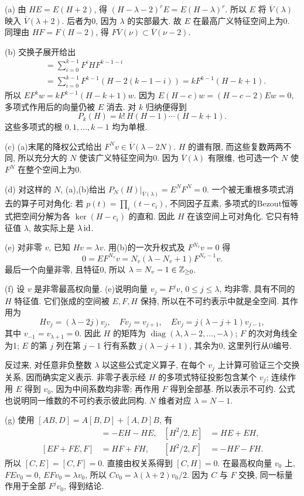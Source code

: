 \begin{solution}
(a) 由 $HE=E(H+2)$, 得 $(H-\lambda-2)^rE=E(H-\lambda)^r$. 所以 $E$ 将 $\overline V(\lambda)$ 映入 $\overline V(\lambda+2)$. 后者为0, 因为 $\lambda$ 的实部最大. 故 $E$ 在最高广义特征空间上为0. 同理由 $HF=F(H-2)$, 得 $F\overline V(\nu)\subset\overline V(\nu-2)$.

(b) 交换子展开给出
\begin{align*}
[E,F^k]&=\sum_{i=0}^{k-1}F^iHF^{k-1-i}\\
&=\sum_{i=0}^{k-1}F^{k-1}(H-2(k-1-i))
=kF^{k-1}(H-k+1).
\end{align*}
所以 $EF^kw=kF^{k-1}(H-k+1)w$. 因为 $E(H-c)w=(H-c-2)Ew=0$, 多项式作用后的向量仍被 $E$ 消去. 对 $k$ 归纳便得到
\[
P_k(H)=k!\,H(H-1)\cdots(H-k+1).
\]
这些多项式的根 $0,1,\ldots,k-1$ 均为单根.

(c) (a)末尾的降权公式给出 $F^Nv\in\overline V(\lambda-2N)$. $H$ 的谱有限, 而这些复数两两不同, 所以充分大的 $N$ 使该广义特征空间为0. 因为 $\overline V(\lambda)$ 有限维, 也可选一个 $N$ 使 $F^N$ 在整个空间上为0.

(d) 对这样的 $N$, (a),(b)给出 $P_N(H)|_{\overline V(\lambda)}=E^NF^N=0$. 一个被无重根多项式消去的算子可对角化: 若 $p(t)=\prod_i(t-c_i)$, 不同因子互素, 多项式的Bezout恒等式把空间分解为各 $\ker(H-c_i)$ 的直和. 因此 $H$ 在该空间上可对角化. 它只有特征值 $\lambda$, 故实际上是 $\lambda\operatorname{id}$.

(e) 对非零 $v$, 已知 $Hv=\lambda v$. 用(b)的一次升权式及 $F^{N_v}v=0$ 得
\[
0=EF^{N_v}v=N_v(\lambda-N_v+1)F^{N_v-1}v.
\]
最后一个向量非零, 且特征0, 所以 $\lambda=N_v-1\in\mathbb Z_{\ge0}$.

(f) 设 $v$ 是非零最高权向量. (e)说明向量 $v_j=F^jv$, $0\le j\le\lambda$, 均非零, 具有不同的 $H$ 特征值. 它们张成的空间被 $E,F,H$ 保持, 所以在不可约表示中就是全空间. 其作用为
\[
Hv_j=(\lambda-2j)v_j,\quad
Fv_j=v_{j+1},\quad
Ev_j=j(\lambda-j+1)v_{j-1},
\]
其中 $v_{-1}=v_{\lambda+1}=0$. 因此 $H$ 的矩阵为 $\operatorname{diag}(\lambda,\lambda-2,\ldots,-\lambda)$; $F$ 的次对角线全为1; $E$ 的第 $j$ 列在第 $j-1$ 行有系数 $j(\lambda-j+1)$, 其余为0, 这里列行从0编号.

反过来, 对任意非负整数 $\lambda$ 以这些公式定义算子, 在每个 $v_j$ 上计算可验证三个交换关系, 因而确实定义表示. 非零子表示经 $H$ 的多项式特征投影包含某个 $v_j$; 连续作用 $E$ 得到 $v_0$, 因为中间系数均非零; 再作用 $F$ 得到全部基. 所以表示不可约. 公式也说明同一维数的不可约表示彼此同构. $N$ 维者对应 $\lambda=N-1$.

(g) 使用 $[AB,D]=A[B,D]+[A,D]B$, 有
\begin{align*}
[EF+FE,E]&=-EH-HE,&[H^2/2,E]&=HE+EH,\\
[EF+FE,F]&=HF+FH,&[H^2/2,F]&=-HF-FH.
\end{align*}
所以 $[C,E]=[C,F]=0$. 直接由权关系得到 $[C,H]=0$. 在最高权向量 $v_0$ 上, $FEv_0=0$, $EFv_0=\lambda v_0$, 所以 $Cv_0=\lambda(\lambda+2)v_0/2$. 因为 $C$ 与 $F$ 交换, 同一标量作用于全部 $F^jv_0$, 得到结论.


\end{solution}
